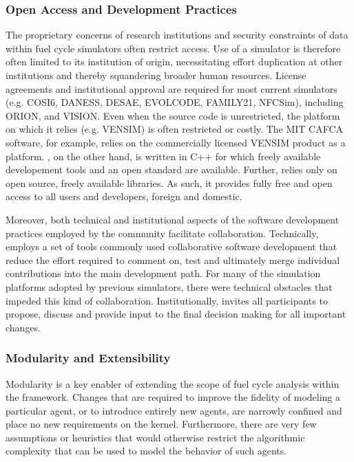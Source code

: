 
\subsubsection{Open Access and Development Practices}

The proprietary concerns of research institutions and security constraints of
data within fuel cycle simulators often restrict access. Use of a simulator is
therefore often limited to its institution of origin, necessitating effort
duplication at other institutions and thereby squandering broader human
resources. License agreements and institutional approval are required for most
current simulators (e.g. \gls{COSI}6, \gls{DANESS}, \gls{DESAE}, EVOLCODE,
FAMILY21, \gls{NFCSim})\cite{juchau_modeling_2010}, including ORION,
and \gls{VISION}.  Even when the source code is unrestricted, the platform on which it relies (e.g. VENSIM) 
is often restricted or costly. The MIT \gls{CAFCA} software, for example, 
relies on the commercially licensed VENSIM product as a platform.
\Cyclus, on the other hand, is written in C++ for which freely available 
developement tools and an open standard are available. Further, \Cyclus relies 
only on open source, freely available libraries. As such, it provides fully 
free and open access to all users and developers, foreign and domestic.

Moreover, both technical and institutional aspects of the software development
practices employed by the \Cyclus community facilitate collaboration.
Technically, \Cyclus employs a set of tools commonly used collaborative
software development that reduce the effort required to comment on, test and
ultimately merge individual contributions into the main development path.
For many of the simulation platforms adopted by previous simulators, there were
technical obstacles that impeded this kind of collaboration.
Institutionally, \Cyclus invites all participants to propose, discuss and
provide input to the final decision making for all important changes.

\subsubsection{Modularity and Extensibility}

Modularity is a key enabler of extending the scope of fuel cycle analysis
within the \Cyclus framework.  Changes that are required to improve the
fidelity of modeling a particular agent, or to introduce entirely new agents,
are narrowly confined and place no new requirements on the \Cyclus kernel.
Furthermore, there are very few assumptions or heuristics that would otherwise
restrict the algorithmic complexity that can be used to model the behavior of
such agents.

